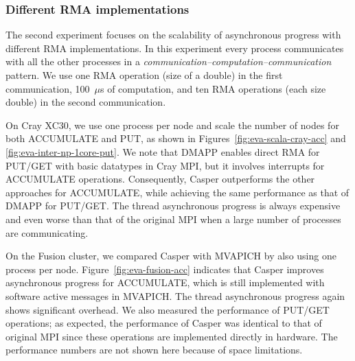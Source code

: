 \subsubsection{Different RMA implementations}\label{sec:eva-rma}

The second experiment focuses on the scalability of asynchronous
progress with different RMA implementations.  In this experiment every
process communicates with all the other processes in a
\emph{communication--computation--communication} pattern.  We use one
RMA operation (size of a double) in the first communication,
100~$\mu$s of computation, and ten RMA operations (each size double)
in the second communication.

On Cray XC30, we use one process per node and scale the number of
nodes for both ACCUMULATE and PUT, as shown in
Figures~\ref{fig:eva-scala-cray-acc} and
\ref{fig:eva-inter-np-1core-put}.  We note that DMAPP enables direct
RMA for PUT\slash GET with basic datatypes in Cray MPI, but it involves
interrupts for ACCUMULATE operations.  Consequently, Casper
outperforms the other approaches for ACCUMULATE, while achieving the
same performance as that of DMAPP for PUT\slash GET.  The thread
asynchronous progress is always expensive and even worse than that of the
original MPI when a large number of processes are communicating.

On the Fusion cluster, we compared Casper with MVAPICH by also using
one process per node. Figure~\ref{fig:eva-fusion-acc} indicates that Casper improves
asynchronous progress for ACCUMULATE, which is still implemented with
software active messages in MVAPICH.  The thread asynchronous progress
again shows significant overhead.  We also measured the performance of
PUT\slash GET operations; as expected, the performance
of Casper was identical to that of original MPI since these operations
are implemented directly in hardware.  The performance numbers are not
shown here because of space limitations.



